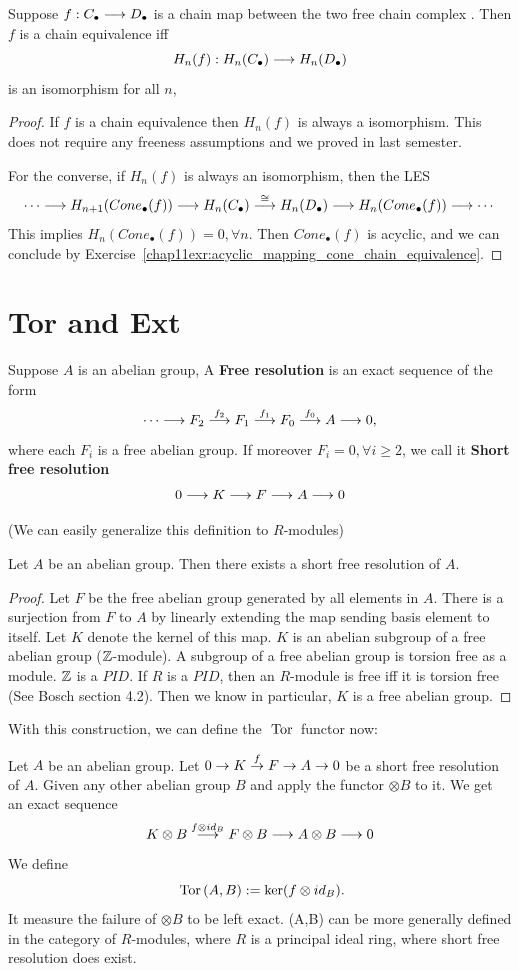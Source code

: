\documentclass[11pt]{book} %
\begin{document}
\begin{exr}\label{chap11exr:free_chain_equivalence_isomorphic_homology}
Suppose $f:C_\bullet\longrightarrow D_\bullet$ is  a chain map between the two free chain complex . Then $f$ is a chain equivalence iff 
$$
H_n(f): H_n(C_\bullet)\longrightarrow H_n(D_\bullet)
$$
is an isomorphism for all $n$,
\end{exr}
\begin{proof}
If $f$ is a chain equivalence then $H_n (f)$ is always a isomorphism. This does not require any freeness assumptions and we proved in last semester.

For the converse, if $H_n(f)$ is always an isomorphism, then the LES
$$
\cdots\longrightarrow H_{n+1}(Cone_\bullet(f))\longrightarrow H_n(C_\bullet)\overset{\cong}{\longrightarrow} H_n (D_\bullet)\longrightarrow H_n(Cone_\bullet(f))\longrightarrow \cdots
$$
This implies $H_n(Cone_\bullet (f))=0,\forall n$. Then $Cone_\bullet(f)$ is acyclic, and we can conclude by Exercise~\ref{chap11exr:acyclic_mapping_cone_chain_equivalence}.
\end{proof}
\section{Tor and Ext}
\begin{definition}
Suppose $A$ is an abelian group, A \textbf{Free resolution} is an exact sequence of the form
$$
\cdots\longrightarrow F_2\overset{f_2}{\longrightarrow}F_1\overset{f_1}{\longrightarrow}F_0\overset{f_0}{\longrightarrow}A\longrightarrow 0,
$$
where each $F_i$ is a free abelian group. If moreover $F_i=0,\forall i\geq 2$, we call it \textbf{Short free resolution} 
$$
0\longrightarrow K\longrightarrow F\longrightarrow A\longrightarrow 0
$$
\end{definition}
(We can easily generalize this definition to $R$-modules)
\begin{proposition}
Let $A$ be an abelian group. Then there exists a short free resolution of $A$.
\end{proposition}
\begin{proof}
Let $F$ be the free abelian group generated by all elements in $A$. There is a surjection from $F$ to $A$ by linearly extending the map sending basis element to itself. Let $K$ denote the kernel of this map. $K$ is an abelian subgroup of a free abelian group ($\mathbb Z$-module).  A subgroup of a free abelian group is torsion free as a module. $\mathbb Z$ is a $PID$. If $R$ is a $PID$, then an  $R$-module is free iff it is torsion free (See Bosch section 4.2). Then we know in particular, $K$ is a free abelian group.
\end{proof}
With this construction, we can define the $\text{ Tor\,}$ functor now:
\begin{definition}
Let $A$ be an abelian group. Let $0\rightarrow K\overset{f}{\rightarrow}F\rightarrow A\rightarrow 0$ be a short free resolution of $A$. Given any other abelian group $B$ and apply the functor $\otimes B$ to it. We get an exact sequence
$$
K\otimes B\overset{f\otimes id_B}{\longrightarrow} F\otimes B\longrightarrow A\otimes B\longrightarrow 0
$$
We define 
$$
\text{ Tor\,}(A,B):=\ker(f\otimes id_B).
$$
It measure the failure of $\otimes B$ to be left exact.
\tor(A,B) can be more generally defined in the category of $R$-modules, where $R$ is a principal ideal ring, where short free resolution does exist. 
\end{definition}
\end{document}
